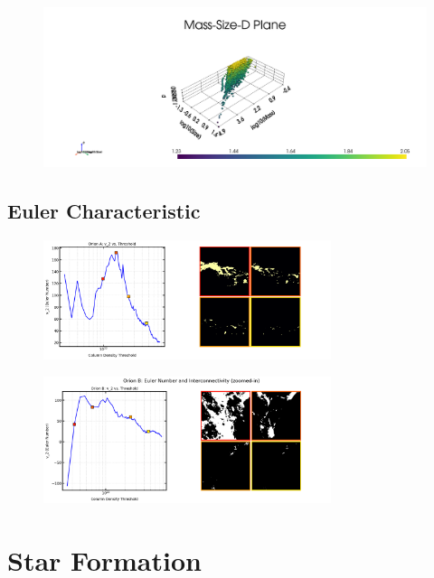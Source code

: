 \begin{figure}[t]
    \centering
    \includegraphics[width=1.0\textwidth]{figures/MSD_plane.png}
    \caption{}
    \label{fig:MSD_orion_A_B}
\end{figure}

\subsection{Euler Characteristic}

\begin{figure}[t]
    \centering
    \includegraphics[width=0.75\textwidth]{figures/euler_Orion_A.png}
    \caption{}
    \label{fig:Euler_Orion_A}
\end{figure}

\begin{figure}[t]
    \centering
    \includegraphics[width=0.75\textwidth]{figures/euler_Orion_B.png}
    \caption{}
    \label{fig:Euler_Orion_B}
\end{figure}

\section{Star Formation}

